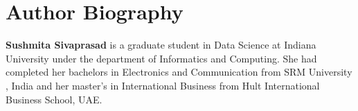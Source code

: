 \documentclass[9pt,twocolumn,twoside]{../../styles/osajnl}
\begin{document}
\section{Author Biography}

\textbf{Sushmita Sivaprasad} is a graduate student in Data Science at
Indiana University under the department of Informatics and
Computing. She had completed her bachelors in Electronics and
Communication from SRM University , India and her master's in
International Business from Hult International Business School, UAE.


\end{document}
